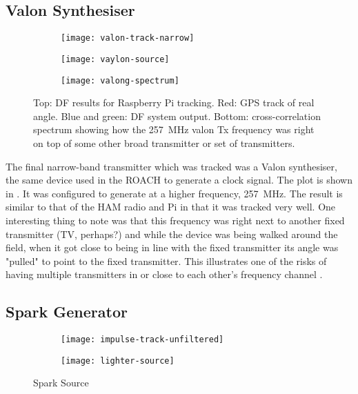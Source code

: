 \subsection{Valon Synthesiser}
\begin{figure}
  \centering
  \vspace{4em}
  \begin{subfigure}[b]{0.77\textwidth}
    \centering
    \texttt{[image: valon-track-narrow]}
  \end{subfigure}
  \begin{subfigure}[b]{0.22\textwidth}
    \centering
    \texttt{[image: vaylon-source]}
    \vspace{2em}
  \end{subfigure}
  \vspace{4em}
  \begin{subfigure}[b]{\textwidth}
    \centering
    \texttt{[image: valong-spectrum]}
  \end{subfigure}
  \caption{Top: DF results for Raspberry Pi tracking. Red: GPS track of real angle. Blue and green: DF system output. Bottom: cross-correlation spectrum showing how the \SI{257}{\mega\hertz} valon Tx frequency was right on top of some other broad transmitter or set of transmitters.}
  \label{fig:field-trials:valon-source}
\end{figure}

The final narrow-band transmitter which was tracked was a Valon synthesiser, the same device used in the ROACH to generate a clock signal. The plot is shown in . It was configured to generate at a higher frequency, \SI{257}{\mega\hertz}. The result is similar to that of the HAM radio and Pi in that it was tracked very well. One interesting thing to note was that this frequency was right next to another fixed transmitter (TV, perhaps?) and while the device was being walked around the field, when it got close to being in line with the fixed transmitter its angle was "pulled" to point to the fixed transmitter. This illustrates one of the risks of having multiple transmitters in or close to each other's frequency channel .

\subsection{Spark Generator}

\begin{figure}
  \centering
  \begin{subfigure}[b]{0.82\textwidth}
    \centering
    \texttt{[image: impulse-track-unfiltered]}
  \end{subfigure}
  \begin{subfigure}[b]{0.17\textwidth}
    \centering
    \texttt{[image: lighter-source]}
  \end{subfigure}
  \caption{Spark Source}
  \label{fig:field-trials:impulse-source}
\end{figure}

